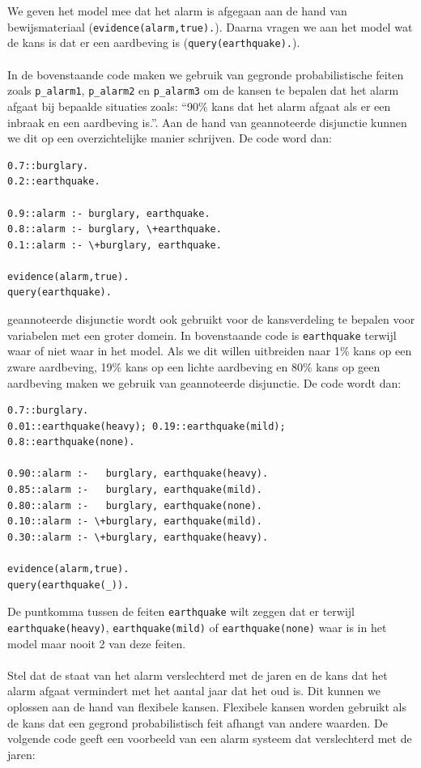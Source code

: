 \documentclass[12pt,a4paper,oneside]{book}
\theoremstyle{definition}
\newcommand{\quotes}[1]{``#1''}
\begin{document}
\\\\
We geven het model mee dat het alarm is afgegaan aan de hand van bewijsmateriaal (\lstinline{evidence(alarm,true).}). Daarna vragen we aan het model wat de kans is dat er een aardbeving is (\lstinline{query(earthquake).}).
\\\\
In de bovenstaande code maken we gebruik van gegronde probabilistische feiten zoals \lstinline{p_alarm1}, \lstinline{p_alarm2} en \lstinline{p_alarm3} om de kansen te bepalen dat het alarm afgaat bij bepaalde situaties zoals: \quotes{90\% kans dat het alarm afgaat als er een inbraak en een aardbeving is.}. Aan de hand van geannoteerde disjunctie kunnen we dit op een overzichtelijke manier schrijven. De code word dan:
\begin{lstlisting}
0.7::burglary.
0.2::earthquake.

0.9::alarm :- burglary, earthquake.
0.8::alarm :- burglary, \+earthquake.
0.1::alarm :- \+burglary, earthquake.

evidence(alarm,true).
query(earthquake).
\end{lstlisting}
geannoteerde disjunctie wordt ook gebruikt voor de kansverdeling te bepalen voor variabelen met een groter domein. In bovenstaande code is \lstinline{earthquake} terwijl waar of niet waar in het model. Als we dit willen uitbreiden naar 1\% kans op een zware aardbeving, 19\% kans op een lichte aardbeving en 80\% kans op geen aardbeving maken we gebruik van geannoteerde disjunctie. De code wordt dan:
\begin{lstlisting}
0.7::burglary.
0.01::earthquake(heavy); 0.19::earthquake(mild); 0.8::earthquake(none).

0.90::alarm :-   burglary, earthquake(heavy).
0.85::alarm :-   burglary, earthquake(mild).
0.80::alarm :-   burglary, earthquake(none).
0.10::alarm :- \+burglary, earthquake(mild).
0.30::alarm :- \+burglary, earthquake(heavy).

evidence(alarm,true).
query(earthquake(_)).
\end{lstlisting}
De puntkomma tussen de feiten \lstinline{earthquake} wilt zeggen dat er terwijl \lstinline{earthquake(heavy)}, \lstinline{earthquake(mild)} of \lstinline{earthquake(none)} waar is in het model maar nooit 2 van deze feiten.
\\\\
Stel dat de staat van het alarm verslechterd met de jaren en de kans dat het alarm afgaat vermindert met het aantal jaar dat het oud is. Dit kunnen we oplossen aan de hand van flexibele kansen. Flexibele kansen worden gebruikt als de kans dat een gegrond probabilistisch feit afhangt van andere waarden. De volgende code geeft een voorbeeld van een alarm systeem dat verslechterd met de jaren:
\end{document}
